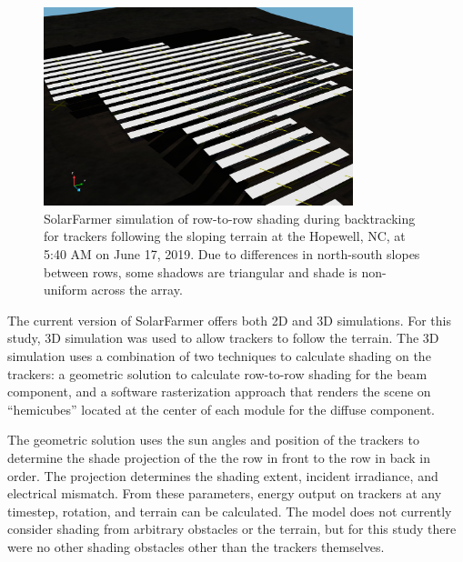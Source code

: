 \documentclass[conference]{IEEEtran}
\begin{document}
\begin{figure}[htbp]
\centerline{\includegraphics[width=9cm]{Hopewell-Friends-SolarFarmer-shade-follows-std.png}}
\caption{SolarFarmer simulation of row-to-row shading during backtracking for trackers following the sloping terrain at the Hopewell, NC, at 5:40 AM on June 17, 2019. Due to differences in north-south slopes between rows, some shadows are triangular and shade is non-uniform across the array.}
\label{terrain-shade}
\end{figure}

The current version of SolarFarmer offers both 2D and 3D simulations. For this study, 3D simulation was used to allow trackers to follow the terrain. The 3D simulation uses a combination of two techniques to calculate shading on the trackers: a geometric solution to calculate row-to-row shading for the beam component, and a software rasterization approach that renders the scene on “hemicubes” located at the center of each module for the diffuse component. 

The geometric solution uses the sun angles and position of the trackers to determine the shade projection of the the row in front to the row in back in order. The projection determines the shading extent, incident irradiance, and electrical mismatch. From these parameters,  energy output on trackers at any timestep, rotation, and terrain can be calculated. The model does not currently consider shading from arbitrary obstacles or the terrain, but for this study there were no other shading obstacles other than the trackers themselves.
\end{document}
